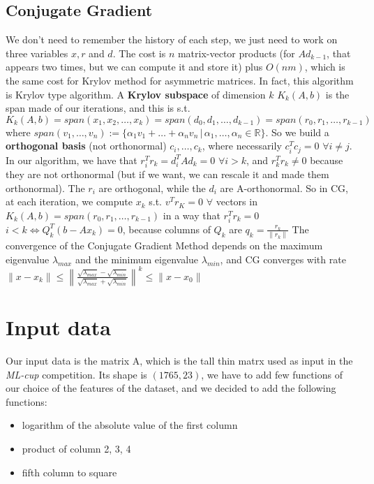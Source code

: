 \documentclass{article}
\begin{document}
\subsection{Conjugate Gradient}
We don't need to remember the history of each step, we just need to work on three variables $x, r$ and $d$. The cost is $n$ matrix-vector products (for $Ad_{k-1}$, that appears two times, but we can compute it and store it) plus $O(nm)$, which is the same cost for Krylov method for asymmetric matrices. In fact, this algorithm is Krylov type algorithm.
A \textbf{Krylov subspace} of dimension $k$ $K_{k}(A, b)$ is the span made of our iterations, and this is s.t. $K_{k}(A, b) = span(x_{1}, x_{2}, \hdots, x_{k}) = span(d_{0}, d_{1}, \hdots, d_{k-1}) = span(r_{0}, r_{1}, \hdots, r_{k-1})$ where $span(v_{1}, \hdots, v_{n}) := \{\alpha_{1}v_{1} + \hdots + \alpha_{n}v_{n} \,|\, \alpha_{1}, \hdots, \alpha_{n} \in \mathds{R}\}$.
So we build a \textbf{orthogonal basis} (not orthonormal) $c_{i}, \hdots, c_{k}$, where necessarily $c_{i}^{T}c_{j} = 0$ $\forall i \neq j$. In our algorithm, we have that $r_{i}^{T}r_{k} = d_{i}^{T}Ad_{k} = 0$ $\forall i > k$, and $r_{k}^{T}r_{k} \neq 0$ because they are not orthonormal (but if we want, we can rescale it and made them orthonormal). The $r_{i}$ are orthogonal, while the $d_{i}$ are A-orthonormal.
So in CG, at each iteration, we compute $x_{k}$ s.t. $v^{T}r_{K} = 0$ $\forall$ vectors in $K_{k}(A, b) = span(r_{0}, r_{1}, \hdots, r_{k-1})$ in a way that $r_{i}^{T}r_{k} = 0$ $i < k \iff Q_{k}^{T}(b - Ax_{k}) = 0$, because columns of $Q_{k}$ are $q_{k} = \frac{r_{k}}{\|r_{k}\|}$
The convergence of the Conjugate Gradient Method depends on the maximum eigenvalue $\lambda_{max}$ and the minimum eigenvalue $\lambda_{min}$, and CG converges with rate 
\\$\|x-x_{k}\| \leq \left\lVert\frac{\sqrt{\lambda_{max}}-\sqrt{\lambda_{min}}}{\sqrt{\lambda_{max}}+\sqrt{\lambda_{min}}}\right\rVert^{k} \leq \|x - x_{0}\|$
\section{Input data}
Our input data is the matrix A, which is the tall thin matrx used as input in the \textit{ML-cup} competition. Its shape is $(1765, 23)$, we have to add few functions of our choice of the features of the dataset, and we decided to add the following functions:
\begin{itemize}
	\item logarithm of the absolute value of the first column
	\item product of column 2, 3, 4
	\item fifth column to square
\end{itemize}
\end{document}
